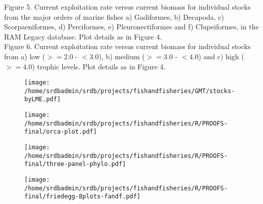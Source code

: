 \documentclass[letterpaper,12pt]{article}
\begin{document}
\noindent Figure 5.  Current exploitation rate versus current biomass for individual stocks from the major orders of marine fishes a) Gadiformes, b) Decapoda, c) Scorpaeniformes, d) Perciformes, e) Pleuronectiformes and f) Clupeiformes, in the RAM Legacy database. Plot details as in Figure 4.
\\

\noindent Figure 6.  Current exploitation rate versus current biomass for individual stocks from a) low ($>=2.0$ - $<3.0$), b) medium ($>=3.0$ - $<4.0$) and c) high ($>=4.0$) trophic levels. Plot details as in Figure 4.

\begin{landscape}
\begin{figure}
\begin{center}
\texttt{[image: /home/srdbadmin/srdb/projects/fishandfisheries/GMT/stocks-byLME.pdf]}
\end{center}
\caption{ }\label{fig:lmes}
\end{figure}
\end{landscape}



\begin{landscape}
\begin{figure}
\begin{center}
\texttt{[image: /home/srdbadmin/srdb/projects/fishandfisheries/R/PROOFS-final/orca-plot.pdf]}
\end{center}
\caption{ }\label{fig:orca}
\end{figure}
\end{landscape}


\begin{figure}
\begin{center}
\texttt{[image: /home/srdbadmin/srdb/projects/fishandfisheries/R/PROOFS-final/three-panel-phylo.pdf]} %
\end{center}
\caption{ }\label{fig:taxo:threepanel}
\end{figure}


\begin{figure}
\begin{center}
\texttt{[image: /home/srdbadmin/srdb/projects/fishandfisheries/R/PROOFS-final/friedegg-8plots-fandf.pdf]}
\end{center}
\caption{ }\label{fig:friedegg}
\end{figure}
\end{document}
